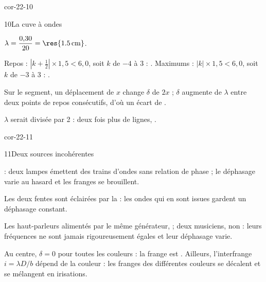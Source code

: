 \begin{blocLivre}{cor-22-10}
\begin{corrige}{10}{La cuve à ondes}
\begin{questions}
\item $\lambda=\dfrac{0{,}30}{20}=\res{\qty{1,5}{cm}}$.
\item Repos : $|k+\frac12|\times1{,}5<6{,}0$, soit $k$ de $-4$ à 3 : . Maximums : $|k|\times1{,}5<6{,}0$, soit
$k$ de $-3$ à 3 : .
\item Sur le segment, un déplacement de $x$ change $\delta$ de $2x$ ; $\delta$ augmente de $\lambda$ entre deux points de repos
consécutifs, d'où un écart de .
\item $\lambda$ serait divisée par 2 : deux fois plus de lignes, .
\end{questions}
\end{corrige}
\end{blocLivre}
\begin{blocLivre}{cor-22-11}
\begin{corrige}{11}{Deux sources incohérentes}
\begin{questions}
\item {} : deux lampes émettent des trains d'ondes sans relation de phase ; le déphasage varie au hasard et
les franges se brouillent.
\item Les deux fentes sont éclairées par la  : les ondes qui en sont issues gardent un déphasage
constant.
\item Les haut-parleurs alimentés par le même générateur,  ; deux musiciens, non : leurs fréquences ne sont
jamais rigoureusement égales et leur déphasage varie.
\item Au centre, $\delta=0$ pour toutes les couleurs : la frange est . Ailleurs, l'interfrange $i=\lambda D/b$
dépend de la couleur : les franges des différentes couleurs se décalent et se mélangent en irisations.
\end{questions}
\end{corrige}
\end{blocLivre}
